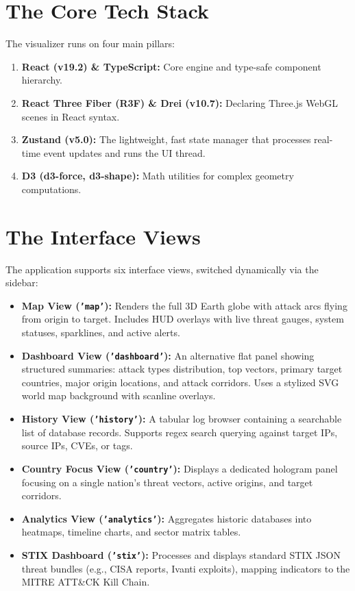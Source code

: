\documentclass[11pt,a4paper]{report}
\begin{document}
\section{The Core Tech Stack}
The visualizer runs on four main pillars:
\begin{enumerate}
  \item \textbf{React (v19.2) \& TypeScript:} Core engine and type-safe component hierarchy.
  \item \textbf{React Three Fiber (R3F) \& Drei (v10.7):} Declaring Three.js WebGL scenes in React syntax.
  \item \textbf{Zustand (v5.0):} The lightweight, fast state manager that processes real-time event updates and runs the UI thread.
  \item \textbf{D3 (d3-force, d3-shape):} Math utilities for complex geometry computations.
\end{enumerate}

\section{The Interface Views}
The application supports six interface views, switched dynamically via the sidebar:
\begin{itemize}
  \item \textbf{Map View (\texttt{'map'}):} Renders the full 3D Earth globe with attack arcs flying from origin to target. Includes HUD overlays with live threat gauges, system statuses, sparklines, and active alerts.
  \item \textbf{Dashboard View (\texttt{'dashboard'}):} An alternative flat panel showing structured summaries: attack types distribution, top vectors, primary target countries, major origin locations, and attack corridors. Uses a stylized SVG world map background with scanline overlays.
  \item \textbf{History View (\texttt{'history'}):} A tabular log browser containing a searchable list of database records. Supports regex search querying against target IPs, source IPs, CVEs, or tags.
  \item \textbf{Country Focus View (\texttt{'country'}):} Displays a dedicated hologram panel focusing on a single nation's threat vectors, active origins, and target corridors.
  \item \textbf{Analytics View (\texttt{'analytics'}):} Aggregates historic databases into heatmaps, timeline charts, and sector matrix tables.
  \item \textbf{STIX Dashboard (\texttt{'stix'}):} Processes and displays standard STIX JSON threat bundles (e.g., CISA reports, Ivanti exploits), mapping indicators to the MITRE ATT\&CK Kill Chain.
\end{itemize}
\end{document}
